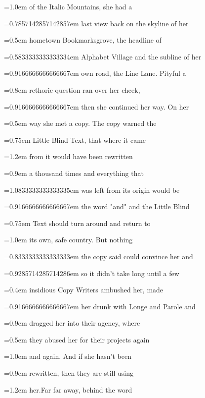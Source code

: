 \documentclass{article}
\begin{document}
 \font=1.0em of the Italic Mountains, she had a 

 \font=0.7857142857142857em last view back on the skyline of her 

 \font=0.5em hometown Bookmarksgrove, the headline of 

 \font=0.5833333333333334em Alphabet Village and the subline of her 

 \font=0.9166666666666667em own road, the Line Lane. Pityful a 

 \font=0.8em rethoric question ran over her cheek, 

 \font=0.9166666666666667em then she continued her way. On her 

 \font=0.5em way she met a copy. The copy warned the 

 \font=0.75em Little Blind Text, that where it came 

 \font=1.2em from it would have been rewritten 

 \font=0.9em a thousand times and everything that 

 \font=1.0833333333333335em was left from its origin would be 

 \font=0.9166666666666667em the word "and" and the Little Blind 

 \font=0.75em Text should turn around and return to 

 \font=1.0em its own, safe country. But nothing 

 \font=0.8333333333333333em the copy said could convince her and 

 \font=0.9285714285714286em so it didn’t take long until a few 

 \font=0.4em insidious Copy Writers ambushed her, made 

 \font=0.9166666666666667em her drunk with Longe and Parole and 

 \font=0.9em dragged her into their agency, where 

 \font=0.5em they abused her for their projects again 

 \font=1.0em and again. And if she hasn’t been 

 \font=0.9em rewritten, then they are still using 

 \font=1.2em her.Far far away, behind the word 
\end{document}

